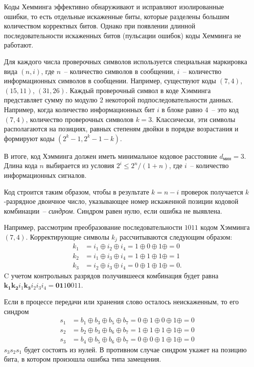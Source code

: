 \documentclass[12pt,a4paper]{article}
\begin{document}
  Коды Хемминга эффективно обнаруживают и исправляют изолированные ошибки, то есть отдельные искаженные биты, которые разделены большим количеством корректных битов. Однако при появлении длинной последовательности искаженных битов (пульсации ошибок) коды Хемминга не работают.
  
  Для каждого числа проверочных символов используется специальная маркировка вида $(n, i)$, где $n$~-- количество символов в сообщении, $i$~-- количество информационных символов в сообщении. Например, существуют коды $(7, 4)$, $(15, 11)$, $(31, 26)$. Каждый проверочный символ в коде Хэмминга представляет сумму по модулю $2$ некоторой подпоследовательности данных. Например, когда количество информационных бит $i$ в блоке равно $4$~-- это код $(7,4)$, количество проверочных символов $k=3$. Классически, эти символы располагаются на позициях, равных степеням двойки в порядке возрастания и формируют коды $(2^k-1,2^k-1-k)$.
  
  В итоге, код Хэмминга должен иметь минимальное кодовое расстояние $d_\text{мин}=3$. Длина кода $n$ выбирается из условия $2^i\leq 2^n/(1+n)$, где $i$~-- количество информационных сигналов.
  
  Код строится таким образом, чтобы в результате $k=n-i$ проверок получается $k$-разрядное двоичное число, указывающее номер искаженной позиции кодовой комбинации~-- \emph{синдром}. Синдром равен нулю, если ошибка не выявлена.
  
  Например, рассмотрим преобразование последовательности $1011$ кодом Хэмминга $(7,4)$. Корректирующие символы $k_j$ рассчитываются следующим образом:
  \begin{align*}
    k_1&=i_1\oplus i_2\oplus i_4= 1\oplus 0\oplus 1\oplus =0 \nonumber \\
    k_2&=i_1\oplus i_3\oplus i_4= 1\oplus 1\oplus 1\oplus =1 \nonumber \\
    k_3&=i_2\oplus i_3\oplus i_4= 0\oplus 1\oplus 1\oplus =0\text{.} \nonumber
  \end{align*}
  C учетом контрольных разрядов получившееся комбинация будет равна $\pmb{k_1k_2}i_1\pmb{k_3}i_2i_3i_4=\pmb{01}1\pmb{0}011$.
  
  Если в процессе передачи или хранения слово осталось неискаженным, то его синдром
  \begin{align*}
    s_1&=b_1\oplus b_3\oplus b_5\oplus b_7=0\oplus 1\oplus 0\oplus 1\oplus =0 \nonumber \\
    s_2&=b_2\oplus b_3\oplus b_6\oplus b_7=1\oplus 1\oplus 1\oplus 1\oplus =0 \nonumber \\
    s_3&=b_4\oplus b_5\oplus b_6\oplus b_7=0\oplus 0\oplus 1\oplus 1\oplus =0 \nonumber
  \end{align*}
  $s_3s_2s_1$ будет состоять из нулей. В противном случае синдром укажет на позицию бита, в котором произошла ошибка типа замещения.
  
\end{document}
